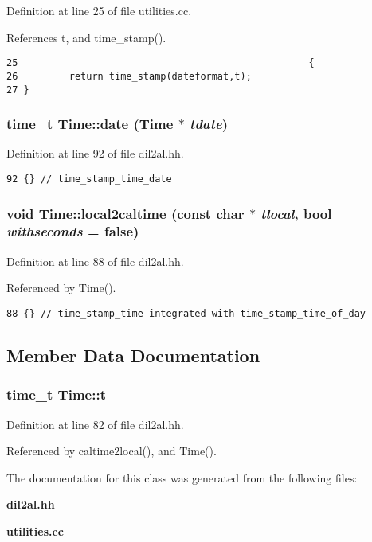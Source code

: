 Definition at line 25 of file utilities.cc.

References t, and time\_\-stamp().



\footnotesize\begin{verbatim}25                                                   {
26         return time_stamp(dateformat,t);
27 }
\end{verbatim}\normalsize 
{}
\subsubsection{\setlength{\rightskip}{0pt plus 5cm}time\_\-t Time::date (Time $\ast$ {\em tdate})\hspace{0.3cm}{\tt  [inline]}}\label{classTime_a8}




Definition at line 92 of file dil2al.hh.



\footnotesize\begin{verbatim}92 {} // time_stamp_time_date
\end{verbatim}\normalsize 
{}
\subsubsection{\setlength{\rightskip}{0pt plus 5cm}void Time::local2caltime (const char $\ast$ {\em tlocal}, bool {\em withseconds} = {\bf false})\hspace{0.3cm}{\tt  [inline]}}\label{classTime_a4}




Definition at line 88 of file dil2al.hh.

Referenced by Time().



\footnotesize\begin{verbatim}88 {} // time_stamp_time integrated with time_stamp_time_of_day
\end{verbatim}\normalsize 


\subsection{Member Data Documentation}
\subsubsection{\setlength{\rightskip}{0pt plus 5cm}time\_\-t Time::t\hspace{0.3cm}{\tt  [protected]}}\label{classTime_n0}




Definition at line 82 of file dil2al.hh.

Referenced by caltime2local(), and Time().

The documentation for this class was generated from the following files:\begin{CompactItemize}
\item 
{\bf dil2al.hh}\item 
{\bf utilities.cc}\end{CompactItemize}
